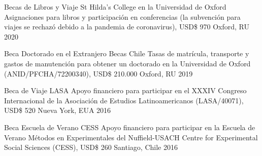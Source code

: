 





\vspace{1mm}

\begin{cvhonors}
\cvhonor
{Becas de Libros y Viaje St Hilda's College en la Universidad de Oxford} 
{Asignaciones para libros y participación en conferencias (la subvención para viajes se rechazó debido a la pandemia de coronavirus), USD{\$} 970} 
{Oxford, RU}
{2020}
\end{cvhonors}

\vspace{1mm}

\begin{cvhonors}
\cvhonor
{Beca Doctorado en el Extranjero Becas Chile} 
{Tasas de matrícula, transporte y gastos de manutención para obtener un doctorado en la Universidad de Oxford (ANID/PFCHA/72200340), USD{\$} 210.000}
{Oxford, RU}
{2019}
\end{cvhonors}

\vspace{1mm}

\begin{cvhonors}
\cvhonor
{Beca de Viaje LASA} 
{Apoyo financiero para participar en el XXXIV Congreso Internacional de la Asociación de Estudios Latinoamericanos (LASA/40071), USD{\$} 520}
{Nueva York, EUA}
{2016}
\end{cvhonors}

\vspace{1mm}

\begin{cvhonors}
\cvhonor
{Beca Escuela de Verano CESS}
{Apoyo financiero para participar en la Escuela de Verano Métodos en Experimentales del Nuffield-USACH Centre for Experimental Social Sciences (CESS), USD{\$} 260}
{Santiago, Chile}
{2016}
\end{cvhonors}

